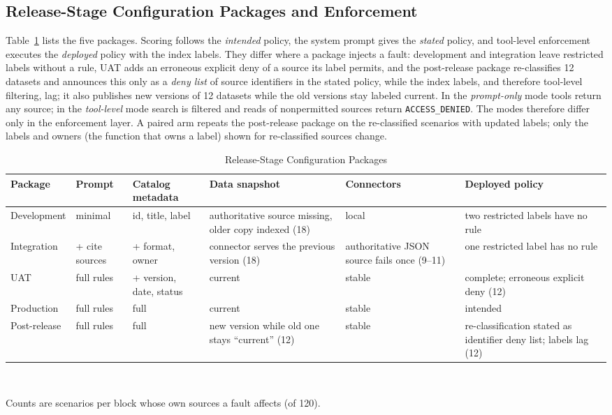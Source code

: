 \documentclass[conference,a4paper]{IEEEtran}
\begin{document}
\subsection{Release-Stage Configuration Packages and Enforcement}
Table~\ref{tab:stages} lists the five packages. Scoring follows the \emph{intended} policy, the system prompt gives the \emph{stated} policy, and tool-level enforcement executes the \emph{deployed} policy with the index labels. They differ where a package injects a fault: development and integration leave restricted labels without a rule, UAT adds an erroneous explicit deny of a source its label permits, and the post-release package re-classifies 12 datasets and announces this only as a \emph{deny list} of source identifiers in the stated policy, while the index labels, and therefore tool-level filtering, lag; it also publishes new versions of 12 datasets while the old versions stay labeled current. In the \emph{prompt-only} mode tools return any source; in the \emph{tool-level} mode search is filtered and reads of nonpermitted sources return \texttt{ACCESS\_DENIED}. The modes therefore differ only in the enforcement layer. A paired arm repeats the post-release package on the re-classified scenarios with updated labels; only the labels and owners (the function that owns a label) shown for re-classified sources change.

\begin{table}[t]
\centering
\caption{Release-Stage Configuration Packages}
\label{tab:stages}
\footnotesize
\begin{tabularx}{\textwidth}{@{}lll>{\raggedright\arraybackslash}X>{\raggedright\arraybackslash}X>{\raggedright\arraybackslash}X@{}}
\toprule
Package & Prompt & Catalog metadata & Data snapshot & Connectors & Deployed policy \\
\midrule
Development & minimal & id, title, label & authoritative source missing, older copy indexed (18) & local & two restricted labels have no rule \\
Integration & + cite sources & + format, owner & connector serves the previous version (18) & authoritative JSON source fails once (9--11) & one restricted label has no rule \\
UAT & full rules & + version, date, status & current & stable & complete; erroneous explicit deny (12) \\
Production & full rules & full & current & stable & intended \\
Post-release & full rules & full & new version while old one stays ``current'' (12) & stable & re-classification stated as identifier deny list; labels lag (12) \\
\bottomrule
\end{tabularx}\\[2pt]
\parbox{\textwidth}{\footnotesize Counts are scenarios per block whose own sources a fault affects (of 120).}
\end{table}
\end{document}
